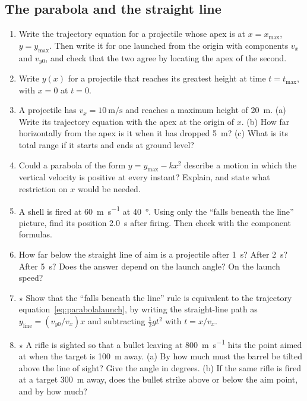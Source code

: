 \documentclass[11pt,twoside,openany]{book}
\newcounter{check}[chapter]
\begin{document}
\subsection*{The parabola and the straight line}
\begin{enumerate}[label=\textbf{\thechapter.\arabic*},resume=exercises,leftmargin=*]
  \item Write the trajectory equation for a projectile whose apex is at $x = x_{\max}$, $y = y_{\max}$. Then write it for one launched from the origin with components $v_x$ and $v_{y0}$, and check that the two agree by locating the apex of the second.
  \item Write $y(x)$ for a projectile that reaches its greatest height at time $t = t_{\max}$, with $x = 0$ at $t = 0$.
  \item A projectile has $v_x = \SI{10}{\metre\per\second}$ and reaches a maximum height of \SI{20}{\metre}. (a) Write its trajectory equation with the apex at the origin of $x$. (b) How far horizontally from the apex is it when it has dropped \SI{5}{\metre}? (c) What is its total range if it starts and ends at ground level?
  \item Could a parabola of the form $y = y_{\max} - kx^2$ describe a motion in which the vertical velocity is positive at every instant? Explain, and state what restriction on $x$ would be needed.
  \item A shell is fired at \SI{60}{\metre\per\second} at \SI{40}{\degree}. Using only the ``falls beneath the line'' picture, find its position \SI{2.0}{\second} after firing. Then check with the component formulas.
  \item How far below the straight line of aim is a projectile after \SI{1}{\second}? After \SI{2}{\second}? After \SI{5}{\second}? Does the answer depend on the launch angle? On the launch speed?
  \item $\star$ Show that the ``falls beneath the line'' rule is equivalent to the trajectory equation~\eqref{eq:parabolalaunch}, by writing the straight-line path as $y_{\text{line}} = (v_{y0}/v_x)x$ and subtracting $\tfrac12 gt^2$ with $t = x/v_x$.
  \item $\star$ A rifle is sighted so that a bullet leaving at \SI{800}{\metre\per\second} hits the point aimed at when the target is \SI{100}{\metre} away. (a) By how much must the barrel be tilted above the line of sight? Give the angle in degrees. (b) If the same rifle is fired at a target \SI{300}{\metre} away, does the bullet strike above or below the aim point, and by how much?\label{ex:sight}
\end{enumerate}
\end{document}
